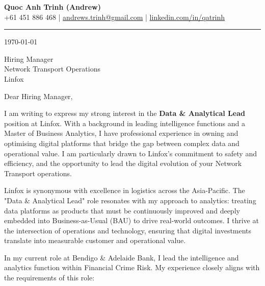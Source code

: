 \documentclass[11pt, a4paper]{article}
\begin{document}
\begin{center}
    {\LARGE \textbf{Quoc Anh Trinh (Andrew)}}\\[4pt]
    {\small
        +61 451 886 468 \quad|\quad
        \href{mailto:andrews.trinh@gmail.com}{andrews.trinh@gmail.com} \quad|\quad
        \href{https://www.linkedin.com/in/qatrinh}{linkedin.com/in/qatrinh}
    }
\end{center}

\vspace{4pt}
\hrule
\vspace{14pt}

\today

\vspace{8pt}

Hiring Manager\\
Network Transport Operations\\
Linfox

\vspace{10pt}

Dear Hiring Manager,

I am writing to express my strong interest in the \textbf{Data \& Analytical Lead} position at Linfox. With a background in leading intelligence functions and a Master of Business Analytics, I have professional experience in owning and optimising digital platforms that bridge the gap between complex data and operational value. I am particularly drawn to Linfox’s commitment to safety and efficiency, and the opportunity to lead the digital evolution of your Network Transport operations.

Linfox is synonymous with excellence in logistics across the Asia-Pacific. The "Data \& Analytical Lead" role resonates with my approach to analytics: treating data platforms as products that must be continuously improved and deeply embedded into Business-as-Usual (BAU) to drive real-world outcomes. I thrive at the intersection of operations and technology, ensuring that digital investments translate into measurable customer and operational value.

In my current role at Bendigo \& Adelaide Bank, I lead the intelligence and analytics function within Financial Crime Risk. My experience closely aligns with the requirements of this role:
\end{document}
